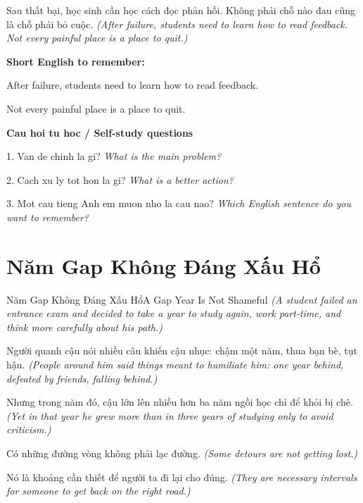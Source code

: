 \begin{baihoc}
Sau thất bại, học sinh cần học cách đọc phản hồi. Không phải chỗ nào đau cũng là chỗ phải bỏ cuộc.
\textit{(After failure, students need to learn how to read feedback. Not every painful place is a place to quit.)}
\end{baihoc}

\begin{ghinhoanh}
\textbf{Short English to remember:}

After failure, students need to learn how to read feedback.

Not every painful place is a place to quit.

\end{ghinhoanh}

\begin{tuhocnhanh}
\textbf{Cau hoi tu hoc / Self-study questions}

1. Van de chinh la gi? \textit{What is the main problem?}

2. Cach xu ly tot hon la gi? \textit{What is a better action?}

3. Mot cau tieng Anh em muon nho la cau nao? \textit{Which English sentence do you want to remember?}
\end{tuhocnhanh}
\ngancach

\section{Năm Gap Không Đáng Xấu Hổ}
\begin{truyen}{Năm Gap Không Đáng Xấu Hổ}{A Gap Year Is Not Shameful}
\textit{(A student failed an entrance exam and decided to take a year to study again, work part-time, and think more carefully about his path.)}

Người quanh cậu nói nhiều câu khiến cậu nhục: chậm một năm, thua bạn bè, tụt hậu.
\textit{(People around him said things meant to humiliate him: one year behind, defeated by friends, falling behind.)}

Nhưng trong năm đó, cậu lớn lên nhiều hơn ba năm ngồi học chỉ để khỏi bị chê.
\textit{(Yet in that year he grew more than in three years of studying only to avoid criticism.)}

Có những đường vòng không phải lạc đường.
\textit{(Some detours are not getting lost.)}

Nó là khoảng cần thiết để người ta đi lại cho đúng.
\textit{(They are necessary intervals for someone to get back on the right road.)}

\end{truyen}

